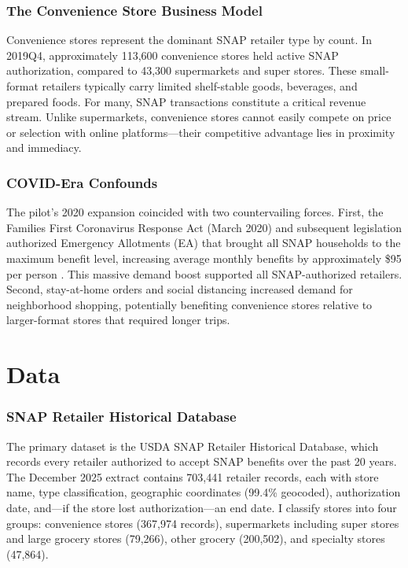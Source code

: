 \documentclass[12pt]{article}
\begin{document}
\subsubsection*{The Convenience Store Business Model} Convenience stores represent the dominant SNAP retailer type by count. In 2019Q4, approximately 113,600 convenience stores held active SNAP authorization, compared to 43,300 supermarkets and super stores. These small-format retailers typically carry limited shelf-stable goods, beverages, and prepared foods. For many, SNAP transactions constitute a critical revenue stream. Unlike supermarkets, convenience stores cannot easily compete on price or selection with online platforms---their competitive advantage lies in proximity and immediacy.

\subsubsection*{COVID-Era Confounds} The pilot's 2020 expansion coincided with two countervailing forces. First, the Families First Coronavirus Response Act (March 2020) and subsequent legislation authorized Emergency Allotments (EA) that brought all SNAP households to the maximum benefit level, increasing average monthly benefits by approximately \$95 per person \citep{rosenbaum_2023}. This massive demand boost supported all SNAP-authorized retailers. Second, stay-at-home orders and social distancing increased demand for neighborhood shopping, potentially benefiting convenience stores relative to larger-format stores that required longer trips.


\section{Data}

\subsubsection*{SNAP Retailer Historical Database} The primary dataset is the USDA SNAP Retailer Historical Database, which records every retailer authorized to accept SNAP benefits over the past 20 years. The December 2025 extract contains 703,441 retailer records, each with store name, type classification, geographic coordinates (99.4\% geocoded), authorization date, and---if the store lost authorization---an end date. I classify stores into four groups: convenience stores (367,974 records), supermarkets including super stores and large grocery stores (79,266), other grocery (200,502), and specialty stores (47,864).
\end{document}
